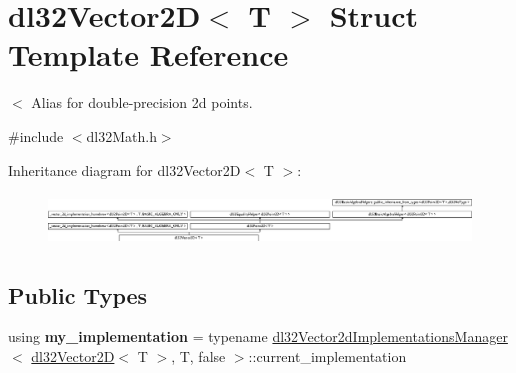 \hypertarget{structdl32_vector2_d}{\section{dl32\-Vector2\-D$<$ T $>$ Struct Template Reference}
\label{structdl32_vector2_d}
}


$<$ Alias for double-\/precision 2d points.  




{\ttfamily \#include $<$dl32\-Math.\-h$>$}

Inheritance diagram for dl32\-Vector2\-D$<$ T $>$\-:\begin{figure}[H]
\begin{center}
\leavevmode
\includegraphics[height=1.387856cm]{structdl32_vector2_d}
\end{center}
\end{figure}
\subsection*{Public Types}
\begin{DoxyCompactItemize}
\item 
\hypertarget{structdl32_vector2_d_a0968bfac9829f02202da46b9cdfca3f3}{using {\bfseries my\-\_\-implementation} = typename \hyperlink{classdl32_vector2d_implementations_manager}{dl32\-Vector2d\-Implementations\-Manager}$<$ \hyperlink{structdl32_vector2_d}{dl32\-Vector2\-D}$<$ T $>$, T, false $>$\-::current\-\_\-implementation}\label{structdl32_vector2_d_a0968bfac9829f02202da46b9cdfca3f3}

\end{DoxyCompactItemize}
